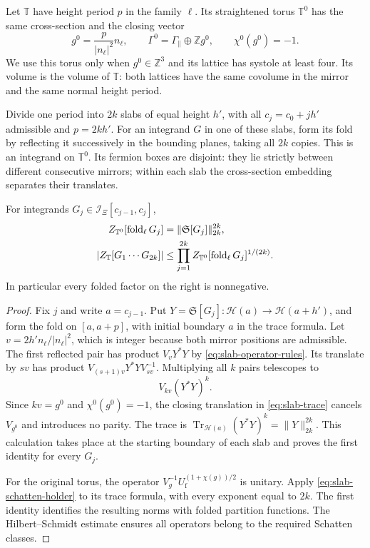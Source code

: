 \documentclass[11pt,letterpaper,reqno]{amsart}
\newcommand{\Z}{\mathbb Z}
\begin{document}
Let $\mathbb T$ have height period $p$ in the family $\ell$. Its
straightened torus $\mathbb T^0$ has the same cross-section and the
closing vector
\begin{equation}\label{eq:slab-straight-vector}
 g^0=\frac p{|n_\ell|^2}n_\ell,
 \qquad \Gamma^0=\Gamma_\parallel\oplus\Z g^0,
 \qquad\chi^0(g^0)=-1.
\end{equation}
We use this torus only when $g^0\in\Z^3$ and its lattice has systole
at least four. Its volume is the volume of $\mathbb T$: both lattices
have the same covolume in the mirror and the same normal height period.

Divide one period into $2k$ slabs of equal height $h'$, with all
$c_j=c_0+jh'$ admissible and $p=2kh'$. For an integrand $G$ in one of
these slabs, form its fold by reflecting it successively in the
bounding planes, taking all $2k$ copies. This is an integrand on
$\mathbb T^0$. Its fermion boxes are disjoint: they lie strictly
between different consecutive mirrors; within each slab the
cross-section embedding separates their translates.

\begin{proposition}\label{prop:slab-fold-holder}
For integrands $G_j\in\mathcal I_\Xi[c_{j-1},c_j]$,
\begin{align}\label{eq:slab-fold-holder}
 Z_{\mathbb T^0}[\operatorname{fold}_\ell G_j]
              &=\|\mathfrak S[G_j]\|_{2k}^{2k},\notag\\
 |Z_{\mathbb T}[G_1\cdots G_{2k}]|
              &\le\prod_{j=1}^{2k}
               Z_{\mathbb T^0}[\operatorname{fold}_\ell G_j]^{1/(2k)}.
\end{align}
In particular every folded factor on the right is nonnegative.
\end{proposition}

\begin{proof}
Fix $j$ and write $a=c_{j-1}$. Put
$Y=\mathfrak S[G_j]:\mathcal H(a)\to\mathcal H(a+h')$, and form
the fold on $[a,a+p]$, with initial boundary $a$ in the trace formula.
Let
$v=2h'n_\ell/|n_\ell|^2$, which is integer because both mirror
positions are admissible. The first reflected pair has product
$V_vY^*Y$ by \eqref{eq:slab-operator-rules}. Its translate by $sv$
has product $V_{(s+1)v}Y^*YV_{sv}^{-1}$. Multiplying all $k$ pairs
telescopes to
\[
 V_{kv}(Y^*Y)^k.
\]
Since $kv=g^0$ and $\chi^0(g^0)=-1$, the closing translation in
\eqref{eq:slab-trace} cancels $V_{g^0}$ and introduces no parity.
The trace is
$\operatorname{Tr}_{\mathcal H(a)}(Y^*Y)^k=\|Y\|_{2k}^{2k}$.
This calculation takes place at the starting boundary of each slab
and proves the first identity for every $G_j$.

For the original torus, the operator
$V_g^{-1}U_{\mathrm f}^{(1+\chi(g))/2}$ is unitary. Apply
\eqref{eq:slab-schatten-holder} to its trace formula, with every
exponent equal to $2k$. The first identity identifies the resulting
norms with folded partition functions. The Hilbert--Schmidt estimate
ensures all operators belong to the required Schatten classes.
\end{proof}
\end{document}

